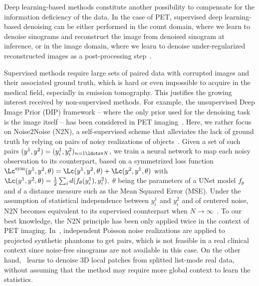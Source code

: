 \documentclass{IEEEtran}
\def\sym{^\text{sym}}
\begin{document}
Deep learning-based methods constitute another possibility to compensate for the information deficiency of the data.
In the case of PET,
supervised deep learning-based denoising %
can be either performed in the count domain, where we learn to denoise sinograms and reconstruct the image from denoised sinogram at inference, or in the image domain, where we learn to denoise under-regularized reconstructed images as a post-processing step~\cite{Hashimoto2024}.

Supervised methods require large sets of paired data with corrupted images and their associated ground truth, which is hard or even impossible to acquire in the medical field, especially in emission tomography. This justifies the growing interest received by non-supervised methods.
For example, the unsupervised Deep Image Prior (DIP) framework -- where the only prior used for the denoising task is the image itself -- has been considered in PET imaging~\cite{Gong2019}.
Here, we rather focus on Noise2Noise (N2N), a self-supervised scheme that
alleviates the lack of ground truth by relying on pairs of noisy realizations of objects~\cite{Lehtinen18}.
Given a set of such pairs $(y^1,y^2)=(y_i^1, y_i^2)_{n=1\ldotsv N}$, we train a neural network to map each noisy observation to its counterpart, based on a symmetrized loss function $\Lc\sym(y^1, y^2, \theta)=\Lc(y^1, y^2, \theta)+\Lc(y^2, y^1, \theta)$ with
$
\Lc(y^1, y^2, \theta) = \frac{1}{2} \sum_i%
d(f_\theta(y_i^1), y_i^2),
$
$\theta$ being the parameters of a UNet model $f_\theta$ and $d$ a distance measure such as the Mean Squared Error (MSE).
Under the assumption of statistical independence between $y_i^1$ and $y_i^2$ and of centered noise, N2N becomes equivalent to its supervised counterpart when $N \to \infty$~\cite{Lehtinen18}.
To our best knowledge, the N2N principle has been only applied twice in the context of PET imaging. In~\cite{Kang2021}, independent Poisson noise realizations are applied to projected synthetic phantoms to get pairs, which is not feasible in a real clinical context since noise-free sinograms are not available in this case.
On the other hand,~\cite{Yie2020} learns to denoise 3D local patches from splitted list-mode real data, without assuming that the method may require more global context to learn the statistics.
\end{document}
